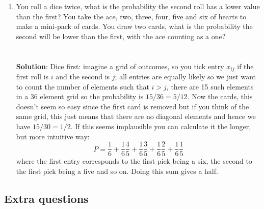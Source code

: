 \documentclass[11pt,a4paper]{scrartcl}
\begin{document}
\begin{enumerate}
\item You roll a dice twice, what is the probability the second roll
  has a lower value than the first? You take the ace, two, three,
  four, five and six of hearts to make a mini-pack of cards. You draw
  two cards, what is the probability the second will be lower than the
  first, with the ace counting as a one?\\ \\ \\ \textbf{Solution}:
  Dice first: imagine a grid of outcomes, so you tick entry $x_{ij}$
  if the first roll is $i$ and the second is $j$; all entries are
  equally likely so we just want to count the number of elements such
  that $i>j$, there are 15 such elements in a 36 element grid so the
  probability is $15/36=5/12$. Now the cards, this doesn't seem so
  easy since the first card is removed but if you think of the same
  grid, this just means that there are no diagonal elements and hence
  we have $15/30=1/2$. If this seems implausible you can calculate it
  the longer, but more intuitive way:
  \begin{equation}
    P=\frac{1}{6}+\frac{1}{6}\frac{4}{5}+\frac{1}{6}\frac{3}{5}+\frac{1}{6}\frac{2}{5}+\frac{1}{6}\frac{1}{5}
  \end{equation}
  where the first entry corresponds to the first pick being a six, the
  second to the first pick being a five and so on. Doing this sum
  gives a half.

\end{enumerate}
  
\subsection*{Extra questions}
\end{document}
